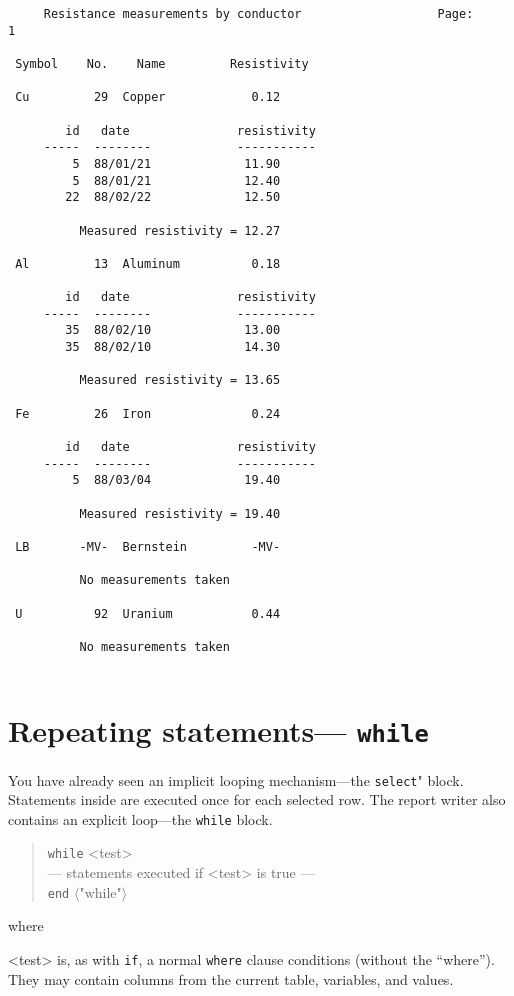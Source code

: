 \documentclass[11pt,a4paper]{report}
\def\opt#1{$\langle \mbox{#1} \rangle$}
\def\I{\index}
\begin{document}
\begin{verbatim}
     Resistance measurements by conductor                   Page:     1
 
 Symbol    No.    Name         Resistivity
 
 Cu         29  Copper            0.12
 
        id   date               resistivity
     -----  --------            -----------
         5  88/01/21             11.90
         5  88/01/21             12.40
        22  88/02/22             12.50
 
          Measured resistivity = 12.27
 
 Al         13  Aluminum          0.18
 
        id   date               resistivity
     -----  --------            -----------
        35  88/02/10             13.00
        35  88/02/10             14.30
 
          Measured resistivity = 13.65
 
 Fe         26  Iron              0.24
 
        id   date               resistivity
     -----  --------            -----------
         5  88/03/04             19.40
 
          Measured resistivity = 19.40
 
 LB       -MV-  Bernstein         -MV-
 
          No measurements taken
 
 U          92  Uranium           0.44
 
          No measurements taken
 
\end{verbatim}
 
\section{Repeating statements--- {\tt while}}
%
\I{while statement}
\I{looping}
You have already seen an implicit looping mechanism---the \verb!select!"
block.  Statements inside are executed once for each selected row.
The report writer also contains an explicit loop---the \verb!while! block.
\begin{verse}
  \verb!while! <test>\\
  --- statements executed if <test> is true ---\\
  \verb!end! \opt{"while"}
\end{verse}
where
\begin{List}
\item[<test>] is, as with \verb!if!, a normal
\verb!where! clause conditions (without the
``where'').  They may contain columns from the current table,
variables, and values.
\end{List}
 
\end{document}
